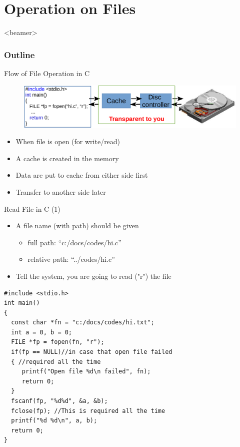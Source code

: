 \section{Operation on Files}
\label{sec:file}
\begin{frame}<beamer>
    \frametitle{Outline}
    \tableofcontents[currentsection]
\end{frame}

\begin{frame}{Flow of File Operation in C}
\begin{figure}
	\includegraphics[width=0.95\linewidth]{figs/flowfio.pdf}
\end{figure}
\begin{itemize}
	\item {When file is open (for write/read)}
	\item {A cache is created in the memory}
	\item {Data are put to cache from either side first}
	\item {Transfer to another side later}
\end{itemize}
\end{frame}

\begin{frame}[fragile]{Read File in C (1)}
\vspace{-0.15in}
\begin{itemize}
	\item {A file name (with path) should be given}
	\begin{itemize}
		\item {full path: ``c:/docs/codes/hi.c''}
		\item {relative path: ``../codes/hi.c''}
	\end{itemize}
	\item {Tell the system, you are going to read ("r") the file}
\end{itemize}
\begin{lstlisting}[xleftmargin=0.06\linewidth, linewidth=0.85\linewidth]
#include <stdio.h>
int main()
{
  const char *fn = "c:/docs/codes/hi.txt";
  int a = 0, b = 0;
  FILE *fp = fopen(fn, "r");
  if(fp == NULL)//in case that open file failed
  { //required all the time
     printf("Open file %d\n failed", fn);
     return 0;
  }
  fscanf(fp, "%d%d", &a, &b);
  fclose(fp); //This is required all the time
  printf("%d %d\n", a, b);
  return 0;
}
\end{lstlisting}
\end{frame}


